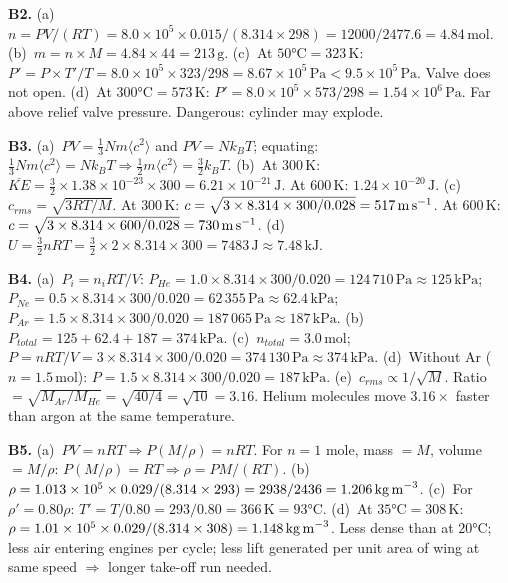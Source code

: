 \textbf{B2.}
(a)~$n=PV/(RT)=8.0\times10^5\times0.015/
(8.314\times298)=12000/2477.6=4.84\,\text{mol}$. \quad
(b)~$m=n\times M=4.84\times44=213\,\text{g}$. \quad
(c)~At $50°\text{C}=323\,\text{K}$:
$P'=P\times T'/T=8.0\times10^5\times323/298
=8.67\times10^5\,\text{Pa}<9.5\times10^5\,\text{Pa}$.
Valve does not open. \quad
(d)~At $300°\text{C}=573\,\text{K}$:
$P'=8.0\times10^5\times573/298=1.54\times10^6\,\text{Pa}$.
Far above relief valve pressure. Dangerous: cylinder may
explode.

\textbf{B3.}
(a)~$PV=\tfrac{1}{3}Nm\langle c^2\rangle$ and
$PV=Nk_BT$; equating:
$\tfrac{1}{3}Nm\langle c^2\rangle=Nk_BT\Rightarrow
\tfrac{1}{2}m\langle c^2\rangle=\tfrac{3}{2}k_BT$.
\checkmark \quad
(b)~At $300\,\text{K}$:
$\overline{KE}=\tfrac{3}{2}\times1.38\times10^{-23}
\times300=6.21\times10^{-21}\,\text{J}$.
At $600\,\text{K}$: $1.24\times10^{-20}\,\text{J}$. \quad
(c)~$c_{rms}=\sqrt{3RT/M}$.
At $300\,\text{K}$:
$c=\sqrt{3\times8.314\times300/0.028}=517\,\text{m\,s}^{-1}$.
At $600\,\text{K}$:
$c=\sqrt{3\times8.314\times600/0.028}=730\,\text{m\,s}^{-1}$.
\quad
(d)~$U=\tfrac{3}{2}nRT=\tfrac{3}{2}\times2\times8.314
\times300=7483\,\text{J}\approx7.48\,\text{kJ}$.

\textbf{B4.}
(a)~$P_i=n_iRT/V$:
$P_{He}=1.0\times8.314\times300/0.020=124\,710\,\text{Pa}
\approx125\,\text{kPa}$;
$P_{Ne}=0.5\times8.314\times300/0.020=62\,355\,\text{Pa}
\approx62.4\,\text{kPa}$;
$P_{Ar}=1.5\times8.314\times300/0.020=187\,065\,\text{Pa}
\approx187\,\text{kPa}$.
\quad
(b)~$P_{total}=125+62.4+187=374\,\text{kPa}$. \quad
(c)~$n_{total}=3.0\,\text{mol}$;
$P=nRT/V=3\times8.314\times300/0.020=374\,130\,\text{Pa}
\approx374\,\text{kPa}$. \checkmark \quad
(d)~Without Ar ($n=1.5\,\text{mol}$):
$P=1.5\times8.314\times300/0.020=187\,\text{kPa}$. \quad
(e)~$c_{rms}\propto1/\sqrt{M}$.
Ratio $=\sqrt{M_{Ar}/M_{He}}=\sqrt{40/4}=\sqrt{10}
=3.16$.
Helium molecules move $3.16\times$ faster than argon
at the same temperature.

\textbf{B5.}
(a)~$PV=nRT\Rightarrow P(M/\rho)=nRT$. For $n=1$
mole, mass $=M$, volume $=M/\rho$:
$P(M/\rho)=RT\Rightarrow\rho=PM/(RT)$. \checkmark \quad
(b)~$\rho=1.013\times10^5\times0.029/(8.314\times293)
=2938/2436=1.206\,\text{kg\,m}^{-3}$. \quad
(c)~For $\rho'=0.80\rho$: $T'=T/0.80=293/0.80
=366\,\text{K}=93°\text{C}$. \quad
(d)~At $35°\text{C}=308\,\text{K}$:
$\rho=1.01\times10^5\times0.029/(8.314\times308)
=1.148\,\text{kg\,m}^{-3}$.
Less dense than at $20°\text{C}$; less air entering
engines per cycle; less lift generated per unit area of
wing at same speed $\Rightarrow$ longer take-off run
needed.

